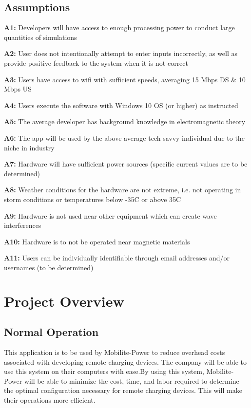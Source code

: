 \documentclass[12pt, titlepage]{article}
\begin{document}
\subsection{Assumptions}
\textbf{A1:} Developers will have access to enough processing power to conduct large quantities of simulations
\par
\textbf{A2:} User does not intentionally attempt to enter inputs incorrectly, as well as provide positive feedback to the system when it is not correct
\par
\textbf{A3:} Users have access to wifi with sufficient speeds, averaging 15 Mbps DS \& 10 Mbps US
\par
\textbf{A4:} Users execute the software with Windows 10 OS (or higher) as instructed
\par 
\textbf{A5:} The average developer has background knowledge in electromagnetic theory
\par 
\textbf{A6:} The app will be used by the above-average tech savvy individual due to the niche in industry
\par
\textbf{A7:} Hardware will have sufficient power sources (specific current values are to be determined)
\par
\textbf{A8:} Weather conditions for the hardware are not extreme, i.e. not operating in storm conditions or temperatures below -35C or above 35C
\par
\textbf{A9:} Hardware is not used near other equipment which can create wave interferences 
\par 
\textbf{A10:} Hardware is to not be operated near magnetic materials
\par
\textbf{A11:} Users can be individually identifiable through email addresses and/or usernames (to be determined)

\section{Project Overview}
\subsection{Normal Operation}
This application is to be used by Mobilite-Power to reduce overhead costs associated with developing remote charging devices. The company will be able to use this system on their computers with ease.By using this system, Mobilite-Power will be able to minimize the cost, time, and labor required to determine the optimal configuration necessary for remote charging devices. This will make their operations more efficient.
\end{document}
